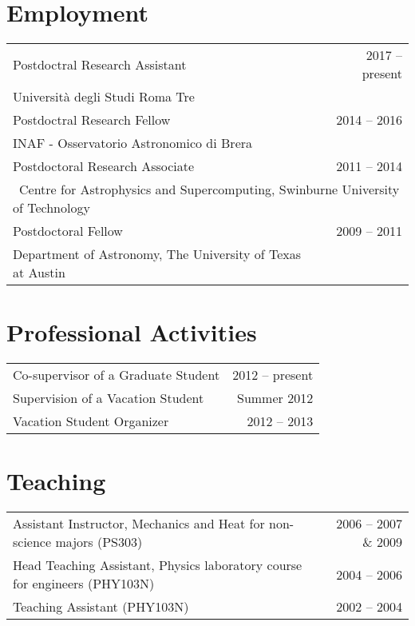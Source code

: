 \section*{Employment}

\hspace{0.05in}
\begin{tabular*}{159.2mm}{@{\extracolsep{\fill}}lr}
  Postdoctral Research Assistant& 2017 -- present\\
  \quad Universit\`{a} degli Studi Roma Tre\\
  Postdoctral Research Fellow & 2014 -- 2016\\
  \quad INAF - Osservatorio Astronomico di Brera\\
  Postdoctoral Research Associate & 2011 -- 2014\\
  \multicolumn{2}{l}{\, Centre for Astrophysics and Supercomputing, Swinburne University of Technology}\\
  Postdoctoral Fellow & 2009 -- 2011\\
  \quad Department of Astronomy, The University of Texas at Austin
\end{tabular*}

\section*{Professional Activities}

\hspace{0.05in}
\begin{tabular*}{159.2mm}{@{\extracolsep{\fill}}lr}
Co-supervisor of a Graduate Student & 2012 -- present\\
Supervision of a Vacation Student & Summer 2012\\
Vacation Student Organizer & 2012 -- 2013\\
\end{tabular*}

\section*{Teaching}

\hspace{0.05in}
\begin{tabular*}{159.2mm}{@{\extracolsep{\fill}}lr}
  Assistant Instructor, Mechanics and Heat for non-science majors (PS303) & 2006 -- 2007 \& 2009\\
  Head Teaching Assistant, Physics laboratory course for engineers (PHY103N) & 2004 -- 2006\\
  Teaching Assistant (PHY103N) & 2002 -- 2004
\end{tabular*}

